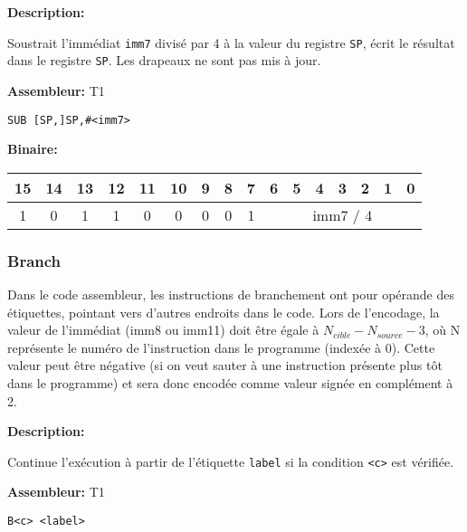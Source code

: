 \documentclass{article}
\begin{document}

    \textbf{Description: }

    Soustrait l'immédiat \texttt{imm7} divisé par 4 à la valeur du registre \texttt{SP}, écrit le résultat dans le registre \texttt{SP}.
    Les drapeaux ne sont pas mis à jour.

    \textbf{Assembleur:} T1

    \begin{lstlisting}
SUB [SP,]SP,#<imm7>
    \end{lstlisting}

    \textbf{Binaire:}

    \begin{tabular}{| c c c c c c c c c c c c c c c c |}
        \hline
        15 & 14 & 13 & 12 & \multicolumn{1}{|c}{11} & 10 & 9 & 8 & \multicolumn{1}{|c}{7} & \multicolumn{1}{|c}{6} & 5 & 4 & 3 & 2 & 1 & 0 \\
        \hline
        1 & 0 & 1 & 1 & \multicolumn{1}{|c}{0} & 0 & 0 & 0 & \multicolumn{1}{|c}{1} & \multicolumn{7}{|c|}{imm7 / 4} \\
        \hline
    \end{tabular}

    \subsubsection{Branch}
    \label{subsubsec:Branching}

    Dans le code assembleur, les instructions de branchement ont pour opérande des étiquettes, pointant vers d'autres endroits dans le code. Lors de l'encodage, la valeur de l'immédiat (imm8 ou imm11) doit être égale à $N_{cible} - N_{source} - 3$, où N représente le numéro de l'instruction dans le programme (indexée à 0). Cette valeur peut être négative (si on veut sauter à une instruction présente plus tôt dans le programme) et sera donc encodée comme valeur signée en complément à 2.

    \label{subsubsubsec:CondBranch}

    \textbf{Description: }

    Continue l'exécution à partir de l'étiquette \texttt{label} si la condition \texttt{<c>} est vérifiée.

    \textbf{Assembleur:} T1

    \begin{lstlisting}
B<c> <label>
    \end{lstlisting}
\end{document}
